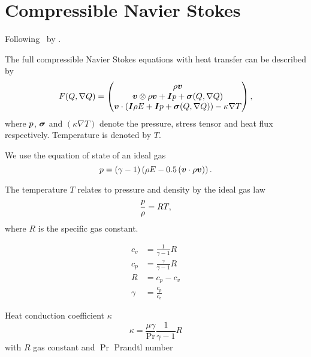 \section{Compressible Navier Stokes}
Following~\cite{dumbser2010arbitrary} by \citeauthor{dumbser2010arbitrary}.

The full compressible Navier Stokes equations with heat transfer can be described by
\begin{equation}
  F(Q, \nabla Q) = 
  \begin{pmatrix}
    \rho \bm{v} \\
    \bm{v}  \otimes \rho \bm{v} + \bm{I} p + \bm{\sigma} (Q, \nabla Q)  \\
    \bm{v} \cdot (\bm{I} \rho E + \bm{I} p + \bm{\sigma} (Q, \nabla Q)) - \kappa \nabla T
  \end{pmatrix},
\end{equation}
where $p$, $\bm{\sigma}$ and $(\kappa \nabla T)$ denote the pressure, stress tensor and heat flux respectively.
Temperature is denoted by $T$.

We use the equation of state of an ideal gas
\begin{equation}
  \label{eq:eos}
  p = (\gamma - 1) \left(\rho E - 0.5 \left(\bm{v} \cdot \rho \bm{v} \right) \right).
\end{equation}

The temperature $T$ relates to pressure and density by the ideal gas law
\begin{equation}
  \label{eq:temperature}
 \frac{p}{\rho} = RT,
\end{equation}
where $R$ is the specific gas constant.

\begin{align}
  c_v &= \frac{1}{\gamma - 1} R \\
  c_p &= \frac{\gamma}{\gamma - 1} R\\
  R &= c_p - c_v\\
  \gamma &= \frac{c_p}{c_v}
\end{align}

Heat conduction coefficient $\kappa$
\begin{equation}
  \label{eq:heat-conduction-coeff}
  \kappa = \frac{\mu \gamma}{\Pr} \frac{1}{\gamma - 1} R
\end{equation}
with $R$ gas constant and $\Pr$ Prandtl number


